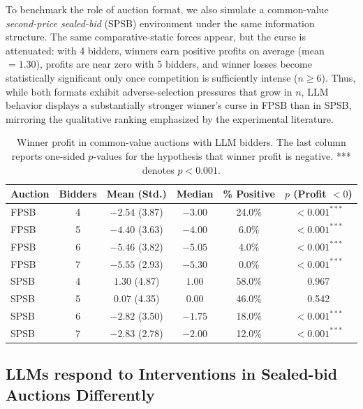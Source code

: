 To benchmark the role of auction format, we also simulate a common-value \emph{second-price sealed-bid} (SPSB) environment under the same information structure. The same comparative-static forces appear, but the curse is attenuated: with 4 bidders, winners earn positive profits on average (mean $=1.30$), profits are near zero with 5 bidders, and winner losses become statistically significant only once competition is sufficiently intense ($n\ge 6$). Thus, while both formats exhibit adverse-selection pressures that grow in $n$, LLM behavior displays a substantially stronger winner’s curse in FPSB than in SPSB, mirroring the qualitative ranking emphasized by the experimental literature\citep{levin1996revenue}.

\begin{table}[H]
\centering
\begin{tabular}{lccccc}
\toprule
\textbf{Auction} & \textbf{Bidders} & \textbf{Mean (Std.)} & \textbf{Median} & \textbf{\% Positive} & \textbf{$p$ (Profit $<0$)} \\
\midrule
FPSB & 4 & $-2.54$ (3.87) & $-3.00$ & 24.0\% & $<0.001^{***}$ \\
FPSB & 5 & $-4.40$ (3.63) & $-4.00$ & 6.0\%  & $<0.001^{***}$ \\
FPSB & 6 & $-5.46$ (3.82) & $-5.05$ & 4.0\%  & $<0.001^{***}$ \\
FPSB & 7 & $-5.55$ (2.93) & $-5.30$ & 0.0\%  & $<0.001^{***}$ \\
\midrule
SPSB & 4 & $1.30$ (4.87)  & $1.00$  & 58.0\% & 0.967 \\
SPSB & 5 & $0.07$ (4.35)  & $0.00$  & 46.0\% & 0.542 \\
SPSB & 6 & $-2.82$ (3.50) & $-1.75$ & 18.0\% & $<0.001^{***}$ \\
SPSB & 7 & $-2.83$ (2.78) & $-2.00$ & 12.0\% & $<0.001^{***}$ \\
\bottomrule
\end{tabular}
\caption{Winner profit in common-value auctions with LLM bidders. The last column reports one-sided $p$-values for the hypothesis that winner profit is negative. *** denotes $p < 0.001$.}
\label{tab:winner_curse_llm}
\end{table}



\subsection{LLMs respond to Interventions in Sealed-bid Auctions Differently}\label{session:Intervention}

